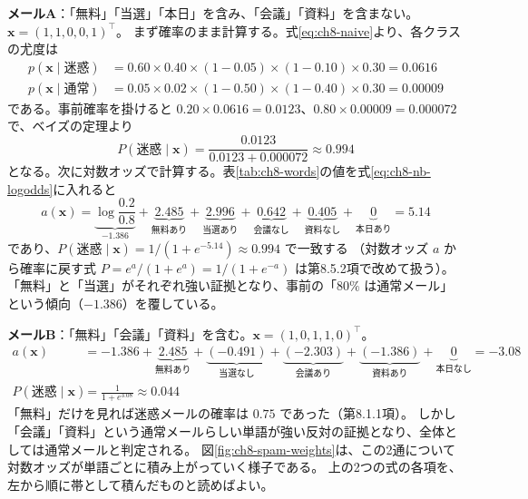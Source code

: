 \textbf{メールA}：「無料」「当選」「本日」を含み、「会議」「資料」を含まない。$\bm{x} = (1, 1, 0, 0, 1)^\top$。
まず確率のまま計算する。式\eqref{eq:ch8-naive}より、各クラスの尤度は
\begin{align*}
  p(\bm{x} \mid \text{迷惑}) &= 0.60 \times 0.40 \times (1 - 0.05) \times (1 - 0.10) \times 0.30 = 0.0616 \\
  p(\bm{x} \mid \text{通常}) &= 0.05 \times 0.02 \times (1 - 0.50) \times (1 - 0.40) \times 0.30 = 0.00009
\end{align*}
である。事前確率を掛けると $0.20 \times 0.0616 = 0.0123$、$0.80 \times 0.00009 = 0.000072$ で、ベイズの定理より
\begin{equation*}
  P(\text{迷惑} \mid \bm{x}) = \frac{0.0123}{0.0123 + 0.000072} \approx 0.994
\end{equation*}
となる。次に対数オッズで計算する。表\ref{tab:ch8-words}の値を式\eqref{eq:ch8-nb-logodds}に入れると
\begin{equation}
  a(\bm{x}) = \underbrace{\log\frac{0.2}{0.8}}_{-1.386} + \underbrace{2.485}_{\text{無料あり}} + \underbrace{2.996}_{\text{当選あり}} + \underbrace{0.642}_{\text{会議なし}} + \underbrace{0.405}_{\text{資料なし}} + \underbrace{0}_{\text{本日あり}} = 5.14
  \label{eq:ch8-mail-a}
\end{equation}
であり、$P(\text{迷惑} \mid \bm{x}) = 1/(1 + e^{-5.14}) \approx 0.994$ で一致する
（対数オッズ $a$ から確率に戻す式 $P = e^a/(1 + e^a) = 1/(1 + e^{-a})$ は第8.5.2項で改めて扱う）。
「無料」と「当選」がそれぞれ強い証拠となり、事前の「$80\%$ は通常メール」という傾向（$-1.386$）を覆している。

\textbf{メールB}：「無料」「会議」「資料」を含む。$\bm{x} = (1, 0, 1, 1, 0)^\top$。
\begin{align*}
  a(\bm{x}) &= -1.386 + \underbrace{2.485}_{\text{無料あり}} + \underbrace{(-0.491)}_{\text{当選なし}} + \underbrace{(-2.303)}_{\text{会議あり}} + \underbrace{(-1.386)}_{\text{資料あり}} + \underbrace{0}_{\text{本日なし}} = -3.08 \\
  P(\text{迷惑} \mid \bm{x}) &= \frac{1}{1 + e^{3.08}} \approx 0.044
\end{align*}
「無料」だけを見れば迷惑メールの確率は $0.75$ であった（第8.1.1項）。
しかし「会議」「資料」という通常メールらしい単語が強い反対の証拠となり、全体としては通常メールと判定される。
図\ref{fig:ch8-spam-weights}は、この2通について対数オッズが単語ごとに積み上がっていく様子である。
上の2つの式の各項を、左から順に帯として積んだものと読めばよい。

